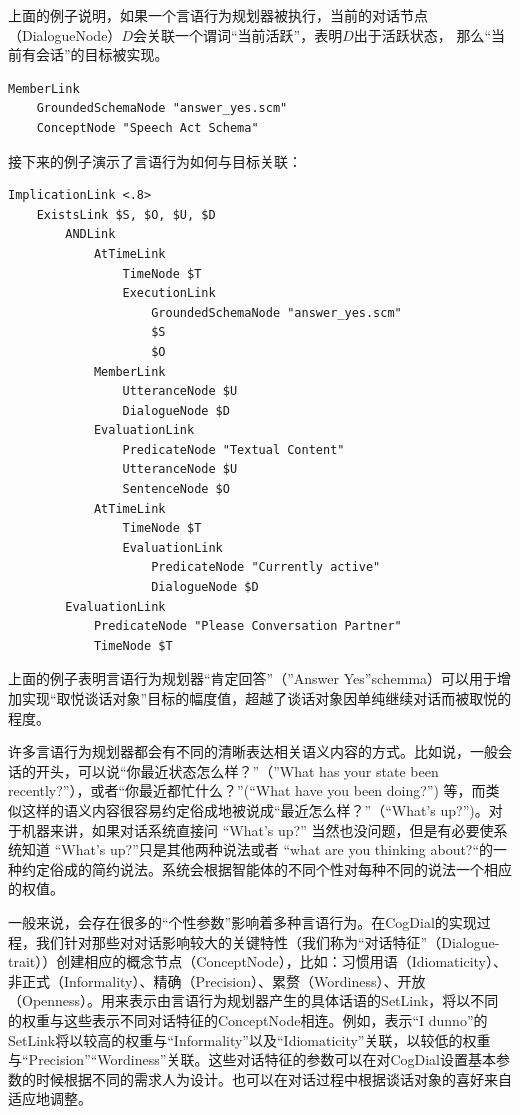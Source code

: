 上面的例子说明，如果一个言语行为规划器被执行，当前的对话节点（DialogueNode）$D$会关联一个谓词“当前活跃”，表明$D$出于活跃状态， 那么“当前有会话”的目标被实现。

 {\tt\begin{small}\begin{lstlisting}
MemberLink
	GroundedSchemaNode "answer_yes.scm"
	ConceptNode "Speech Act Schema"
\end{lstlisting}\end{small}}

接下来的例子演示了言语行为如何与目标关联：

 {\tt\begin{small}\begin{lstlisting}
ImplicationLink <.8>
	ExistsLink $S, $O, $U, $D
		ANDLink
			AtTimeLink
				TimeNode $T
				ExecutionLink
					GroundedSchemaNode "answer_yes.scm"
					$S
					$O
			MemberLink
				UtteranceNode $U
				DialogueNode $D
			EvaluationLink
				PredicateNode "Textual Content"
				UtteranceNode $U
				SentenceNode $O
			AtTimeLink
				TimeNode $T
				EvaluationLink
					PredicateNode "Currently active"
					DialogueNode $D			
		EvaluationLink
			PredicateNode "Please Conversation Partner"
			TimeNode $T
\end{lstlisting}\end{small}}

上面的例子表明言语行为规划器“肯定回答”（”Answer Yes”schemma）可以用于增加实现“取悦谈话对象”目标的幅度值，超越了谈话对象因单纯继续对话而被取悦的程度。

许多言语行为规划器都会有不同的清晰表达相关语义内容的方式。比如说，一般会话的开头，可以说“你最近状态怎么样？”（”What has your state been recently?”），或者“你最近都忙什么？”(“What have you been doing?”) 等，而类似这样的语义内容很容易约定俗成地被说成“最近怎么样？”（“What’s up?”)。对于机器来讲，如果对话系统直接问 “What’s up?” 当然也没问题，但是有必要使系统知道 “What’s up?”只是其他两种说法或者 “what are you thinking about?“的一种约定俗成的简约说法。系统会根据智能体的不同个性对每种不同的说法一个相应的权值。

一般来说，会存在很多的“个性参数”影响着多种言语行为。在CogDial的实现过程，我们针对那些对对话影响较大的关键特性（我们称为“对话特征”（Dialogue-trait））创建相应的概念节点（ConceptNode），比如：习惯用语（Idiomaticity）、非正式（Informality）、精确（Precision）、累赘（Wordiness）、开放（Openness）。用来表示由言语行为规划器产生的具体话语的SetLink，将以不同的权重与这些表示不同对话特征的ConceptNode相连。例如，表示“I dunno”的SetLink将以较高的权重与“Informality”以及“Idiomaticity”关联，以较低的权重与“Precision”“Wordiness”关联。这些对话特征的参数可以在对CogDial设置基本参数的时候根据不同的需求人为设计。也可以在对话过程中根据谈话对象的喜好来自适应地调整。

